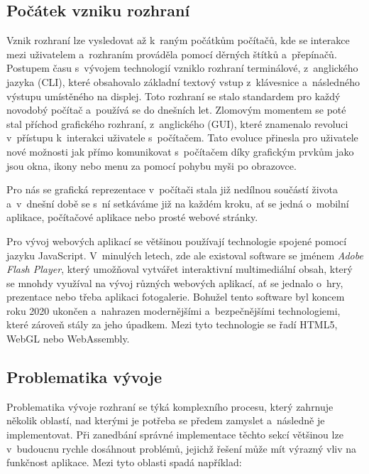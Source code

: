 \subsection{Počátek vzniku rozhraní}
\label{subsec:ui-gui-theory-beginning}
Vznik rozhraní lze vysledovat až k~raným počátkům počítačů, kde se interakce mezi uživatelem a~rozhraním prováděla pomocí děrných štítků a~přepínačů. Postupem času s~vývojem technologií vzniklo rozhraní terminálové, z~anglického jazyka \textit{} (CLI), které obsahovalo základní textový vstup z~klávesnice a~následného výstupu umístěného na displej. Toto rozhraní se stalo standardem pro každý novodobý počítač a~používá se do dnešních let. Zlomovým momentem se poté stal příchod grafického rozhraní, z~anglického \textit{} (GUI), které znamenalo revoluci v~přístupu k~interakci uživatele s~počítačem. Tato evoluce přinesla pro uživatele nové možnosti jak přímo komunikovat s~počítačem díky grafickým prvkům jako jsou okna, ikony nebo menu za pomocí pohybu myši po obrazovce.

Pro nás se grafická reprezentace v~počítači stala již nedílnou součástí života a~v~dnešní době se s~ní setkáváme již na každém kroku, ať se jedná o~mobilní aplikace, počítačové aplikace nebo prosté webové stránky.

Pro vývoj webových aplikací se většinou používají technologie spojené pomocí jazyku JavaScript. V~minulých letech, zde ale existoval software se jménem \textit{Adobe Flash Player}, který umožňoval vytvářet interaktivní multimediální obsah, který se mnohdy využíval na vývoj různých webových aplikací, ať se jednalo o~hry, prezentace nebo třeba aplikaci fotogalerie. Bohužel tento software byl koncem roku 2020 ukončen a~nahrazen modernějšími a~bezpečnějšími technologiemi, které zároveň stály za jeho úpadkem. Mezi tyto technologie se řadí HTML5, WebGL nebo WebAssembly. \cite{adobeFlashPlayer-eol}

\subsection{Problematika vývoje}
\label{subsec:ui-gui-theory-problems}
Problematika vývoje rozhraní se týká komplexního procesu, který zahrnuje několik oblastí, nad kterými je potřeba se předem zamyslet a~následně je implementovat. Při zanedbání správné implementace těchto sekcí většinou lze v~budoucnu rychle dosáhnout problémů, jejichž řešení může mít výrazný vliv na funkčnost aplikace. Mezi tyto oblasti spadá například:

